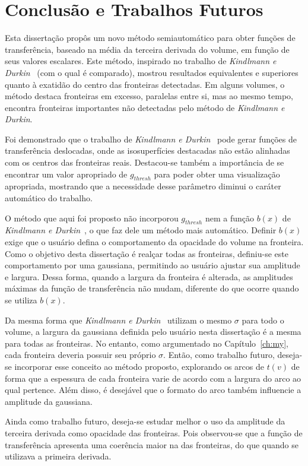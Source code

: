 
\chapter{Conclusão e Trabalhos Futuros}
\label{ch:conclusion}
	Esta dissertação propôs um novo método semiautomático para obter funções de transferência, baseado na média da terceira derivada do volume, em função de seus valores escalares. Este método, inspirado no trabalho de \textit{Kindlmann e Durkin}~\cite{gordon} (com o qual é comparado), mostrou resultados equivalentes e superiores quanto à exatidão do centro das fronteiras detectadas. Em alguns volumes, o método destaca fronteiras em excesso, paralelas entre si, mas ao mesmo tempo, encontra fronteiras importantes não detectadas pelo método de \textit{Kindlmann e Durkin}.

	Foi demonstrado que o trabalho de \textit{Kindlmann e Durkin}~\cite{gordon} pode gerar funções de transferência deslocadas, onde as isosuperfícies destacadas não estão alinhadas com os centros das fronteiras reais. Destacou-se também a importância de se encontrar um valor apropriado de $ g_{thresh} $ para poder obter uma visualização apropriada, mostrando que a necessidade desse parâmetro diminui o caráter automático do trabalho.
	
	O método que aqui foi proposto não incorporou $ g_{thresh} $ nem a função $ b(x) $ de \textit{Kindlmann e Durkin}~\cite{gordon}, o que faz dele um método mais automático. Definir $ b(x) $ exige que o usuário defina o comportamento da opacidade do volume na fronteira. Como o objetivo desta dissertação é realçar todas as fronteiras, definiu-se este comportamento por uma gaussiana, permitindo ao usuário ajustar sua amplitude e largura. Dessa forma, quando a largura da fronteira é alterada, as amplitudes máximas da função de transferência não mudam, diferente do que ocorre quando se utiliza $ b(x) $.
	
	Da mesma forma que \textit{Kindlmann e Durkin}~\cite{gordon} utilizam o mesmo $ \sigma $ para todo o volume, a largura da gaussiana definida pelo usuário nesta dissertação é a mesma para todas as fronteiras. No entanto, como argumentado no Capítulo~\ref{ch:my}, cada fronteira deveria possuir seu próprio $ \sigma $. Então, como trabalho futuro, deseja-se incorporar esse conceito ao método proposto, explorando os arcos de $ t(v) $ de forma que a espessura de cada fronteira varie de acordo com a largura do arco ao qual pertence. Além disso, é desejável que o formato do arco também influencie a amplitude da gaussiana.
	
	Ainda como trabalho futuro, deseja-se estudar melhor o uso da amplitude da terceira derivada como opacidade das fronteiras. Pois observou-se que a função de transferência apresenta uma coerência maior na  das fronteiras, do que quando se utilizava a primeira derivada.